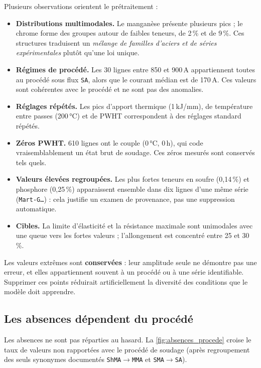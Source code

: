 Plusieurs observations orientent le prétraitement :
\begin{itemize}
  \item \textbf{Distributions multimodales.} Le manganèse présente plusieurs pics ; le chrome forme des groupes autour de faibles teneurs, de 2\,\% et de 9\,\%. Ces structures traduisent un \emph{mélange de familles d'aciers et de séries expérimentales} plutôt qu'une loi unique.
  \item \textbf{Régimes de procédé.} Les 30 lignes entre 850 et 900\,A appartiennent toutes au procédé sous flux \texttt{SA}, alors que le courant médian est de 170\,A. Ces valeurs sont cohérentes avec le procédé et ne sont pas des anomalies.
  \item \textbf{Réglages répétés.} Les pics d'apport thermique (1\,kJ/mm), de température entre passes (200\,°C) et de PWHT correspondent à des réglages standard répétés.
  \item \textbf{Zéros PWHT.} 610 lignes ont le couple (0\,°C, 0\,h), qui code vraisemblablement un état brut de soudage. Ces zéros mesurés sont conservés tels quels.
  \item \textbf{Valeurs élevées regroupées.} Les plus fortes teneurs en soufre (0,14\,\%) et phosphore (0,25\,\%) apparaissent ensemble dans dix lignes d'une même série (\texttt{Mart-G\ldots}) : cela justifie un examen de provenance, pas une suppression automatique.
  \item \textbf{Cibles.} La limite d'élasticité et la résistance maximale sont unimodales avec une queue vers les fortes valeurs ; l'allongement est concentré entre 25 et 30\,\%.
\end{itemize}

\begin{decision}
Les valeurs extrêmes sont \textbf{conservées} : leur amplitude seule ne démontre
pas une erreur, et elles appartiennent souvent à un procédé ou à une série
identifiable. Supprimer ces points réduirait artificiellement la diversité des
conditions que le modèle doit apprendre.
\end{decision}

\subsection{Les absences dépendent du procédé}
\label{subsec:absences_procede}

Les absences ne sont pas réparties au hasard. La \cref{fig:absences_procede}
croise le taux de valeurs non rapportées avec le procédé de soudage (après
regroupement des seuls synonymes documentés \texttt{ShMA}$\to$\texttt{MMA} et
\texttt{SMA}$\to$\texttt{SA}).

